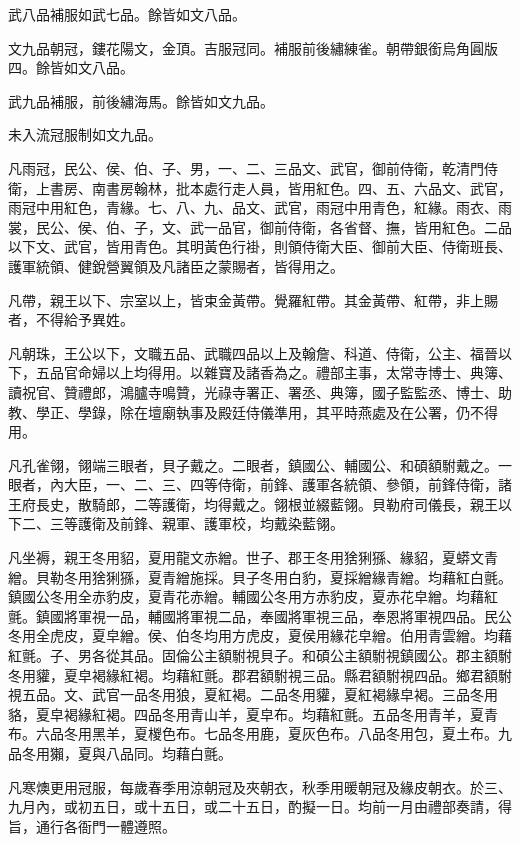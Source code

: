 \begin{pinyinscope}
武八品補服如武七品。餘皆如文八品。

文九品朝冠，鏤花陽文，金頂。吉服冠同。補服前後繡練雀。朝帶銀銜烏角圓版四。餘皆如文八品。

武九品補服，前後繡海馬。餘皆如文九品。

未入流冠服制如文九品。

凡雨冠，民公、侯、伯、子、男，一、二、三品文、武官，御前侍衛，乾清門侍衛，上書房、南書房翰林，批本處行走人員，皆用紅色。四、五、六品文、武官，雨冠中用紅色，青緣。七、八、九、品文、武官，雨冠中用青色，紅緣。雨衣、雨裳，民公、侯、伯、子，文、武一品官，御前侍衛，各省督、撫，皆用紅色。二品以下文、武官，皆用青色。其明黃色行褂，則領侍衛大臣、御前大臣、侍衛班長、護軍統領、健銳營翼領及凡諸臣之蒙賜者，皆得用之。

凡帶，親王以下、宗室以上，皆束金黃帶。覺羅紅帶。其金黃帶、紅帶，非上賜者，不得給予異姓。

凡朝珠，王公以下，文職五品、武職四品以上及翰詹、科道、侍衛，公主、福晉以下，五品官命婦以上均得用。以雜寶及諸香為之。禮部主事，太常寺博士、典簿、讀祝官、贊禮郎，鴻臚寺鳴贊，光祿寺署正、署丞、典簿，國子監監丞、博士、助教、學正、學錄，除在壇廟執事及殿廷侍儀準用，其平時燕處及在公署，仍不得用。

凡孔雀翎，翎端三眼者，貝子戴之。二眼者，鎮國公、輔國公、和碩額駙戴之。一眼者，內大臣，一、二、三、四等侍衛，前鋒、護軍各統領、參領，前鋒侍衛，諸王府長史，散騎郎，二等護衛，均得戴之。翎根並綴藍翎。貝勒府司儀長，親王以下二、三等護衛及前鋒、親軍、護軍校，均戴染藍翎。

凡坐褥，親王冬用貂，夏用龍文赤繒。世子、郡王冬用猞猁猻、緣貂，夏蟒文青繒。貝勒冬用猞猁猻，夏青繒施採。貝子冬用白豹，夏採繒緣青繒。均藉紅白氈。鎮國公冬用全赤豹皮，夏青花赤繒。輔國公冬用方赤豹皮，夏赤花皁繒。均藉紅氈。鎮國將軍視一品，輔國將軍視二品，奉國將軍視三品，奉恩將軍視四品。民公冬用全虎皮，夏皁繒。侯、伯冬均用方虎皮，夏侯用緣花皁繒。伯用青雲繒。均藉紅氈。子、男各從其品。固倫公主額駙視貝子。和碩公主額駙視鎮國公。郡主額駙冬用貛，夏皁褐緣紅褐。均藉紅氈。郡君額駙視三品。縣君額駙視四品。鄉君額駙視五品。文、武官一品冬用狼，夏紅褐。二品冬用貛，夏紅褐緣皁褐。三品冬用貉，夏皁褐緣紅褐。四品冬用青山羊，夏皁布。均藉紅氈。五品冬用青羊，夏青布。六品冬用黑羊，夏椶色布。七品冬用鹿，夏灰色布。八品冬用包，夏土布。九品冬用獺，夏與八品同。均藉白氈。

凡寒燠更用冠服，每歲春季用涼朝冠及夾朝衣，秋季用暖朝冠及緣皮朝衣。於三、九月內，或初五日，或十五日，或二十五日，酌擬一日。均前一月由禮部奏請，得旨，通行各衙門一體遵照。


\end{pinyinscope}
